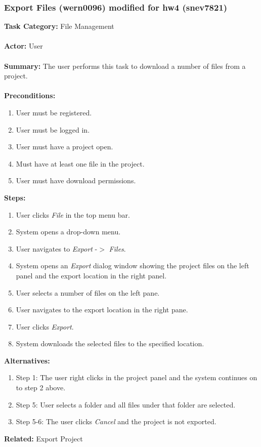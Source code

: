 \documentclass[11pt]{report}
\begin{document}
\subsubsection{Export Files (wern0096) modified for hw4 (snev7821)}
\begin{framed}

	\textbf{Task Category:} File Management \\ \\
	\textbf{Actor:} User \\ \\
	\textbf{Summary:} The user performs this task to download a number of files from a project. \\ \\
	\textbf{Preconditions:} 
	\begin{enumerate}
		\item User must be registered.
		\item User must be logged in.
		\item User must have a project open.
		\item Must have at least one file in the project.
		\item User must have download permissions.
	\end{enumerate}
	\textbf{Steps:}
	\begin{enumerate}
		\item User clicks \textit{File} in the top menu bar.
		\item System opens a drop-down menu.
		\item User navigates to \textit{Export} -$>$ \textit{Files}.
		\item System opens an \textit{Export} dialog window showing the project files on the left panel and the export location in the right panel.
		\item User selects a number of files on the left pane.
		\item User navigates to the export location in the right pane.
		\item User clicks \textit{Export}.
		\item System downloads the selected files to the specified location.
	\end{enumerate}
	\textbf{Alternatives:} 
	\begin{enumerate}
		\item Step 1: The user right clicks in the project panel and the system continues on to step 2 above.
		\item Step 5: User selects a folder and all files under that folder are selected.
		\item Step 5-6: The user clicks \textit{Cancel} and the project is not exported.
	\end{enumerate}
	\textbf{Related:} Export Project
\end{framed}
\end{document}
